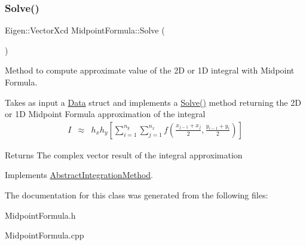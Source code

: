 \subsubsection{\texorpdfstring{Solve()}{Solve()}}
{\footnotesize\ttfamily Eigen\+::\+Vector\+Xcd Midpoint\+Formula\+::\+Solve (\begin{DoxyParamCaption}{ }\end{DoxyParamCaption})\hspace{0.3cm}{\ttfamily [virtual]}}



Method to compute approximate value of the 2D or 1D integral with Midpoint Formula. 

Takes as input a \hyperlink{struct_data}{Data} struct and implements a \hyperlink{class_midpoint_formula_add437323dfb0bc181b0051c5aaf80ba7}{Solve()} method returning the 2D or 1D Midpoint Formula approximation of the integral \begin{eqnarray*} I &\approx& h_x h_y \left[ \sum_{i=1}^{n_y} \sum_{j=1}^{n_x} f\left(\frac{x_{j-1}+x_j}{2}, \frac{y_{i-1}+y_i}{2}\right) \right] \end{eqnarray*}

\begin{DoxyReturn}{Returns}
The complex vector result of the integral approximation 
\end{DoxyReturn}


Implements \hyperlink{class_abstract_integration_method_af76e5bdce7d0b139d07e920fa29c1c34}{Abstract\+Integration\+Method}.



The documentation for this class was generated from the following files\+:\begin{DoxyCompactItemize}
\item 
Midpoint\+Formula.\+h\item 
Midpoint\+Formula.\+cpp\end{DoxyCompactItemize}
